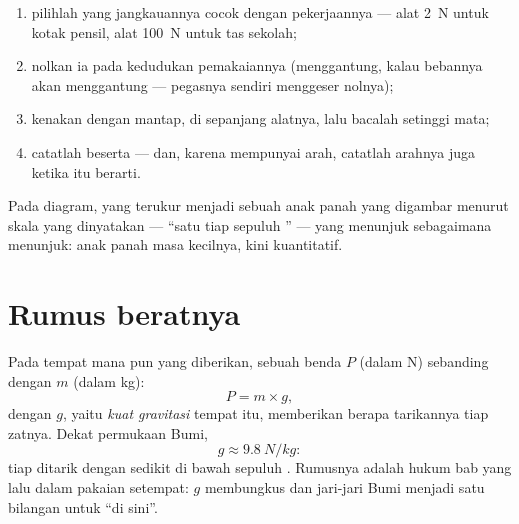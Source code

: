 \begin{method}\label{met:g9:weight-vs-mass:measure}
\begin{enumerate}
  \item pilihlah  yang jangkauannya cocok dengan
        pekerjaannya --- alat \qty{2}{N} untuk kotak pensil, alat
        \qty{100}{N} untuk tas sekolah;
  \item nolkan ia pada kedudukan pemakaiannya (menggantung, kalau
        bebannya akan menggantung ---  pegasnya sendiri
        menggeser nolnya);
  \item kenakan  dengan mantap, di sepanjang  alatnya,
        lalu bacalah setinggi mata;
  \item catatlah beserta  --- dan, karena  mempunyai
        arah, catatlah arahnya juga ketika itu berarti.
\end{enumerate}
Pada diagram,  yang terukur menjadi sebuah anak panah yang digambar
menurut skala yang dinyatakan --- ``satu  tiap sepuluh
'' --- yang menunjuk sebagaimana  menunjuk: anak panah
 masa kecilnya, kini kuantitatif.
\end{method}

\section{Rumus beratnya}

\begin{proposition}\label{prop:g9:weight-vs-mass:formula}
Pada tempat mana pun yang diberikan,  sebuah benda $P$ (dalam
\unit{N}) sebanding dengan  $m$ (dalam \unit{kg}):
\[
P = m \times g ,
\]
dengan $g$, yaitu \emph{kuat gravitasi} tempat
itu, memberikan berapa  tarikannya tiap  zatnya. Dekat
permukaan Bumi,
\[
g \approx \qty{9.8}{N/kg}:
\]
tiap  ditarik dengan sedikit di bawah sepuluh . Rumusnya
adalah hukum bab yang lalu dalam pakaian setempat: $g$ membungkus
 dan jari-jari Bumi menjadi satu bilangan untuk ``di sini''.
\end{proposition}

